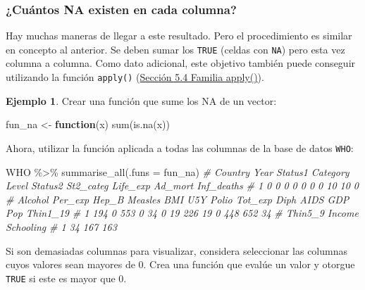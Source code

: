 \documentclass[
]{article}
\newenvironment{Shaded}{\begin{snugshade}}{\end{snugshade}}
\newcommand{\AttributeTok}[1]{\textcolor[rgb]{0.77,0.63,0.00}{#1}}
\newcommand{\CommentTok}[1]{\textcolor[rgb]{0.56,0.35,0.01}{\textit{#1}}}
\newcommand{\ControlFlowTok}[1]{\textcolor[rgb]{0.13,0.29,0.53}{\textbf{#1}}}
\newcommand{\FunctionTok}[1]{\textcolor[rgb]{0.00,0.00,0.00}{#1}}
\newcommand{\NormalTok}[1]{#1}
\newcommand{\OtherTok}[1]{\textcolor[rgb]{0.56,0.35,0.01}{#1}}
\newcommand{\SpecialCharTok}[1]{\textcolor[rgb]{0.00,0.00,0.00}{#1}}
\theoremstyle{definition}
\theoremstyle{definition}
\newtheorem{example}{Ejemplo}[section]
\theoremstyle{definition}
\theoremstyle{definition}
\theoremstyle{remark}
\begin{document}
\hypertarget{cuuxe1ntos-na-existen-en-cada-columna}{%
\subsubsection{¿Cuántos NA existen en cada columna?}\label{cuuxe1ntos-na-existen-en-cada-columna}}

Hay muchas maneras de llegar a este resultado. Pero el procedimiento es similar en concepto al anterior. Se deben sumar los \texttt{TRUE} (celdas con \texttt{NA}) pero esta vez columna a columna. Como dato adicional, este objetivo también puede conseguir utilizando la función \texttt{apply()} (\protect\hyperlink{familia-apply}{Sección 5.4 Familia apply()}).

\begin{example}

Crear una función que sume los NA de un vector:

\begin{Shaded}
\begin{Highlighting}[]
\NormalTok{fun\_na }\OtherTok{\textless{}{-}} \ControlFlowTok{function}\NormalTok{(x) }\FunctionTok{sum}\NormalTok{(}\FunctionTok{is.na}\NormalTok{(x))}
\end{Highlighting}
\end{Shaded}

Ahora, utilizar la función aplicada a todas las columnas de la base de datos \texttt{WHO}:

\begin{Shaded}
\begin{Highlighting}[]
\NormalTok{WHO }\SpecialCharTok{\%\textgreater{}\%} 
  \FunctionTok{summarise\_all}\NormalTok{(}\AttributeTok{.funs =}\NormalTok{ fun\_na)}
\CommentTok{\#   Country Year Status1 Category Level Status2 St2\_categ Life\_exp Ad\_mort Inf\_deaths}
\CommentTok{\# 1       0    0       0        0     0       0         0       10      10          0}
\CommentTok{\#   Alcohol Per\_exp Hep\_B Measles BMI U5Y Polio Tot\_exp Diph AIDS GDP Pop Thin1\_19}
\CommentTok{\# 1     194       0   553       0  34   0    19     226   19    0 448 652       34}
\CommentTok{\#   Thin5\_9 Income Schooling}
\CommentTok{\# 1      34    167       163}
\end{Highlighting}
\end{Shaded}

Si son demasiadas columnas para visualizar, considera seleccionar las columnas cuyos valores sean mayores de 0. Crea una función que evalúe un valor y otorgue \texttt{TRUE} si este es mayor que 0.


\end{example}
\end{document}
